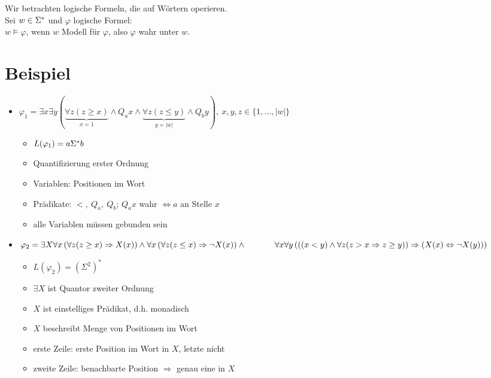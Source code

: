 Wir betrachten logische Formeln, die auf Wörtern operieren.\\
Sei $w\in\Sigma^*$ und $\varphi$ logische Formel:\\
$w\models \varphi$, wenn $w$ Modell für $\varphi$, also $\varphi$ wahr unter $w$.
\section{Beispiel}
    \begin{itemize}
        \item $\varphi_1=\exists x\exists y( \underbrace{\forall z (z\geq x)}_{x=1}\wedge Q_ax\wedge \underbrace{\forall z(z\leq y)}_{y=|w|}\wedge Q_by),\ x,y,z\in\{1,\dots,|w|\}$
        \begin{itemize}
            \item $L(\varphi_1)=a\Sigma^* b$
            \item Quantifizierung erster Ordnung
            \item Variablen: Positionen im Wort
            \item Prädikate: $<,\ Q_a,\ Q_b$; $Q_ax$ wahr $\Leftrightarrow a$ an Stelle $x$
            \item alle Variablen müssen gebunden sein
        \end{itemize}
        \item $\varphi_2=\exists X\forall x\left(\forall z(z\geq x)\Rightarrow X(x)\right)\wedge \forall x\left(\forall z(z\leq x)\Rightarrow \neg X(x)\right)\wedge\\\hspace*{1.2cm} \forall x\forall y\left(\left((x<y)\wedge\forall z (z>x\Rightarrow z\geq y)\right)\Rightarrow\left(X(x)\Leftrightarrow \neg X(y)\right)\right)$
        \begin{itemize}
            \item $L(\varphi_2)=\left(\Sigma^2\right)^*$
            \item $\exists X$ ist Quantor zweiter Ordnung
            \item $X$ ist einstelliges Prädikat, d.h. monadisch
            \item $X$ beschreibt Menge von Positionen im Wort
            \item erste Zeile: erste Position im Wort in $X$, letzte nicht
            \item zweite Zeile: benachbarte Position $\Rightarrow$ genau eine in $X$
        \end{itemize}
    \end{itemize}
